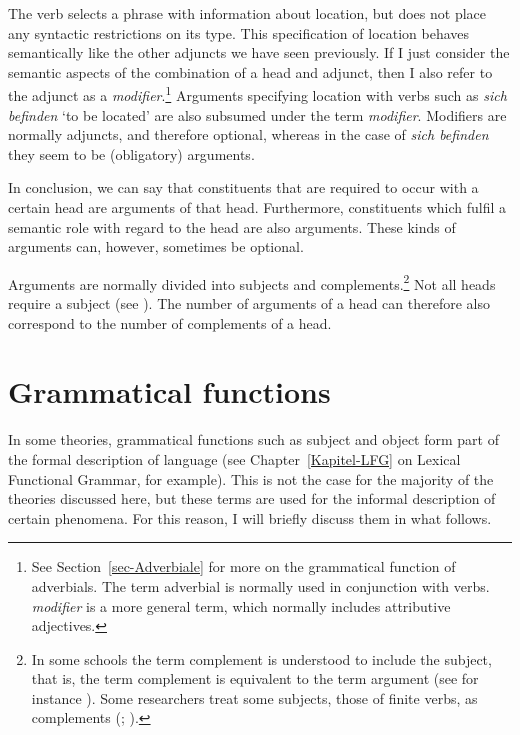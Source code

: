 The verb selects a phrase with information about location, but does not place any syntactic restrictions on its type. This specification
of location behaves semantically like the other adjuncts we have seen previously. If I just consider the semantic aspects of the combination
of a head and adjunct, then I also refer to the adjunct as a \emph{modifier}.\footnote{%
  See Section~\ref{sec-Adverbiale} for more on the grammatical function of adverbials. The term adverbial is normally used
  in conjunction with verbs. \emph{modifier} is a more general term, which normally includes attributive adjectives.%
}
Arguments specifying location with verbs such as \emph{sich befinden} `to be located' are also subsumed under the term \emph{modifier}.
Modifiers are normally adjuncts, and therefore optional, whereas in the case of \emph{sich befinden} they seem to
be (obligatory) arguments.

In conclusion, we can say that constituents that are required to occur with a certain head are arguments of that head. Furthermore,
constituents which fulfil a semantic role with regard to the head are also arguments. These kinds of arguments can, however, sometimes
be optional.

Arguments are normally divided into subjects and complements.\footnote{%
  In some schools the term complement is understood to include the subject, that is, the term
  complement is equivalent to the term argument (see for instance \citealp[]{Gross2003a}). Some researchers treat some subjects, \eg those of finite verbs, as
  complements (\citealp{Pollard90a-Eng}; \citealp[]{Eisenberg94b}).
} Not all heads
require a subject (see \citealp[Section~3.2]{MuellerLehrbuch1}). The number of arguments of a head can therefore
also correspond to the number of complements of a head.

\section{Grammatical functions}
\label{Abschnitt-GF}

In some theories, grammatical functions such as subject and object form part of the formal description
of language (see Chapter~\ref{Kapitel-LFG} on Lexical Functional Grammar, for example). This is not the case for the majority of the
theories discussed here, but these terms are used for the informal description of certain phenomena.
For this reason, I will briefly discuss them in what follows.


